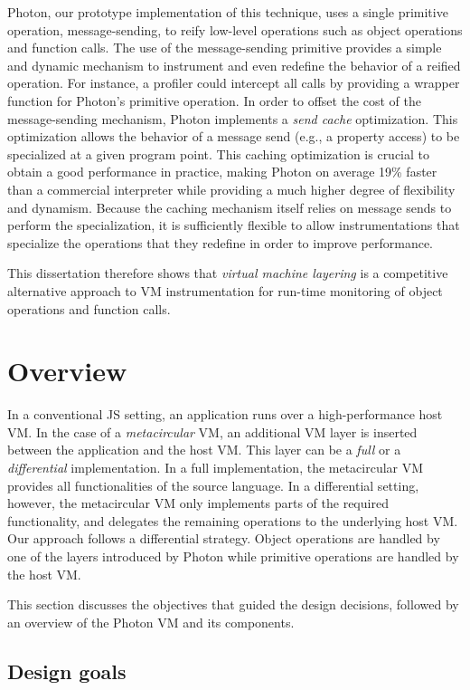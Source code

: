 Photon, our prototype implementation of this technique, uses a single primitive
operation, message-sending, to reify low-level operations such as object
operations and function calls. The use of the message-sending primitive
provides a simple and dynamic mechanism to instrument and even redefine the
behavior of a reified operation. For instance, a profiler could intercept all
calls by providing a wrapper function for Photon's  primitive
operation. In order to offset the cost of the message-sending mechanism, Photon
implements a {\it send cache} optimization. This optimization allows the behavior of
a message send (e.g., a property access) to be specialized at a given program
point. This caching optimization is crucial to obtain a good performance in
practice, making Photon on average 19\% faster than a commercial interpreter
while providing a much higher degree of flexibility and dynamism. Because the
caching mechanism itself relies on message sends to perform the
specialization, it is sufficiently flexible to allow instrumentations that
specialize the operations that they redefine in order to improve performance.

This dissertation therefore shows that \emph{virtual machine layering} is a
competitive alternative approach to VM instrumentation for run-time monitoring
of object operations and function calls.

\section{Overview}

In a conventional JS setting, an application runs over a high-performance host
VM. In the case of a \emph{metacircular} VM, an additional VM layer is
inserted between the application and the host VM. This layer can be a
\emph{full} or a \emph{differential} implementation. In a full implementation,
the metacircular VM provides all functionalities of the source language. In a
differential setting, however, the metacircular VM only implements parts of
the required functionality, and delegates the remaining operations to the
underlying host VM. Our approach follows a differential strategy.
Object
 operations are handled by one of the layers introduced by
Photon while primitive operations are handled by the host VM.

This section discusses the objectives that guided the design decisions,
followed by an overview of the Photon VM and its components.

\subsection{Design goals}

